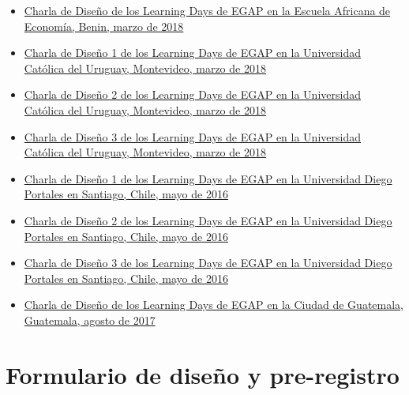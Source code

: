 \documentclass[12pt,spanish,]{book}
\begin{document}
\begin{itemize}
\item
  \href{https://egap.github.io/learningdays-resources/Slides/Examples/research_design_2-benin.pdf}{Charla de Diseño de los Learning Days de EGAP en la Escuela Africana de Economía, Benin, marzo de 2018}
\item
  \href{https://egap.github.io/learningdays-resources/Slides/Examples/research_design_1-montevideo.pdf}{Charla de Diseño 1 de los Learning Days de EGAP en la Universidad Católica del Uruguay, Montevideo, marzo de 2018}
\item
  \href{https://egap.github.io/learningdays-resources/Slides/Examples/research_design_2-montevideo.pdf}{Charla de Diseño 2 de los Learning Days de EGAP en la Universidad Católica del Uruguay, Montevideo, marzo de 2018}
\item
  \href{https://egap.github.io/learningdays-resources/Slides/Examples/research_design_3-montevideo.pdf}{Charla de Diseño 3 de los Learning Days de EGAP en la Universidad Católica del Uruguay, Montevideo, marzo de 2018}
\item
  \href{https://egap.github.io/learningdays-resources/Slides/Examples/research_design_1-santiago.pdf}{Charla de Diseño 1 de los Learning Days de EGAP en la Universidad Diego Portales en Santiago, Chile, mayo de 2016}
\item
  \href{https://egap.github.io/learningdays-resources/Slides/Examples/research_design_2-santiago.pdf}{Charla de Diseño 2 de los Learning Days de EGAP en la Universidad Diego Portales en Santiago, Chile, mayo de 2016}
\item
  \href{https://egap.github.io/learningdays-resources/Slides/Examples/research_design_3-santiago.pdf}{Charla de Diseño 3 de los Learning Days de EGAP en la Universidad Diego Portales en Santiago, Chile, mayo de 2016}
\item
  \href{https://egap.github.io/learningdays-resources/Slides/Examples/research_design-guatemala.pdf}{Charla de Diseño de los Learning Days de EGAP en la Ciudad de Guatemala, Guatemala, agosto de 2017}
\end{itemize}

\hypertarget{formulario-de-diseuxf1o-y-pre-registro}{%
\section{Formulario de diseño y pre-registro}\label{formulario-de-diseuxf1o-y-pre-registro}}
\end{document}
